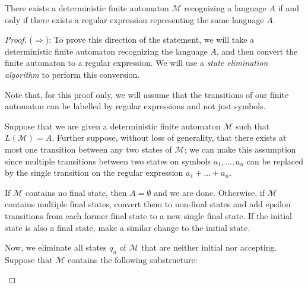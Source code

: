 \begin{theorem}\label{thm:regularregex}
There exists a deterministic finite automaton $\mathcal{M}$ recognizing a language $A$ if and only if there exists a regular expression  representing the same language $A$.

\begin{proof}
($\Rightarrow$): To prove this direction of the statement, we will take a deterministic finite automaton recognizing the language $A$, and then convert the finite automaton to a regular expression. We will use a \emph{state elimination algorithm} to perform this conversion.

Note that, for this proof only, we will assume that the transitions of our finite automaton can be labelled by regular expressions and not just symbols.

Suppose that we are given a deterministic finite automaton $\mathcal{M}$ such that $L(\mathcal{M}) = A$. Further suppose, without loss of generality, that there exists at most one transition between any two states of $\mathcal{M}$; we can make this assumption since multiple transitions between two states on symbols $a_{1}, \dots, a_{n}$ can be replaced by the single transition on the regular expression $a_{1} + \dots + a_{n}$.

If $\mathcal{M}$ contains no final state, then $A = \emptyset$ and we are done. Otherwise, if $\mathcal{M}$ contains multiple final states, convert them to non-final states and add epsilon transitions from each former final state to a new single final state. If the initial state is also a final state, make a similar change to the initial state.

Now, we eliminate all states $q_{u}$ of $\mathcal{M}$ that are neither initial nor accepting. Suppose that $\mathcal{M}$ contains the following substructure:
\begin{center}
\end{center}
\end{proof}
\end{theorem}
